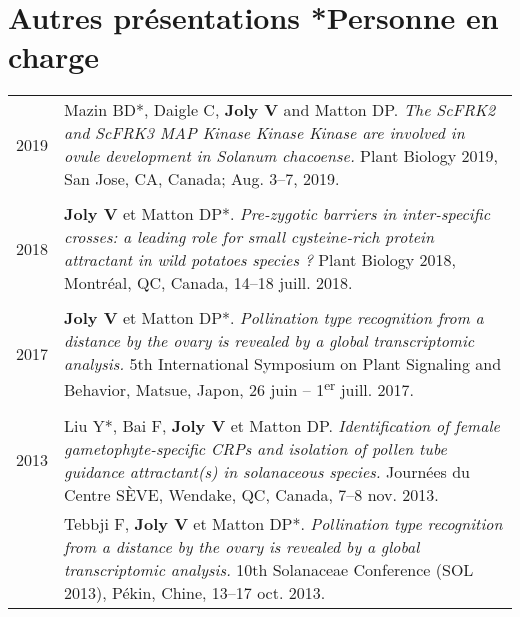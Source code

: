 \documentclass[letterpaper,12pt]{article}
\begin{document}
\vspace{6mm}

\section[Autres présentations]{Autres présentations
\hfill \small{*Personne en charge}}

\begin{tabularx}{\textwidth}{@{}r|X@{}}

2019
& Mazin BD*, Daigle C, \textbf{Joly V} and Matton DP.
  \emph{The ScFRK2 and ScFRK3 MAP Kinase Kinase Kinase are involved in ovule
  development in \emph{Solanum chacoense}.}
  Plant Biology 2019, San Jose, CA, Canada;
  Aug. 3--7, 2019.
  \\

\multicolumn{2}{c}{} \\

2018
& \textbf{Joly V} et Matton DP*.
  \emph{Pre-zygotic barriers in inter-specific crosses: a leading role for small
  cysteine-rich protein attractant in wild potatoes species ?}
  Plant Biology 2018, Montréal, QC, Canada, 14--18 juill. 2018.
  \\

\multicolumn{2}{c}{} \\

2017
& \textbf{Joly V} et Matton DP*.
  \emph{Pollination type recognition from a distance by the ovary is revealed
  by a global transcriptomic analysis.}
  5th International Symposium on Plant Signaling and Behavior, Matsue, Japon,
  26 juin -- 1\textsuperscript{er} juill. 2017.
  \\

\multicolumn{2}{c}{} \\

2013
& Liu Y*, Bai F, \textbf{Joly V} et Matton DP.
  \emph{Identification of female gametophyte-specific CRPs and isolation of
  pollen tube guidance attractant(s) in solanaceous species.}
  Journées du Centre SÈVE, Wendake, QC, Canada, 7--8 nov. 2013.
  \vspace{1.5mm} \\

& Tebbji F, \textbf{Joly V} et Matton DP*. \emph{Pollination type recognition
  from a distance by the ovary is revealed by a global transcriptomic analysis.}
  10th Solanaceae Conference (SOL 2013), Pékin, Chine, 13--17 oct. 2013.
  \vspace{1.5mm} \\


\end{tabularx}
\end{document}
